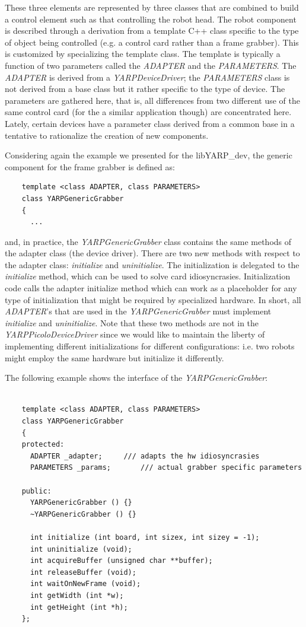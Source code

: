 These three elements are represented by three classes that are combined to build a control element such as that controlling the robot head. The robot component is described through a derivation from a template C++ class specific to the type of object being controlled (e.g. a control card rather than a frame grabber). This is customized by specializing the template class. The template is typically a function of two parameters called the {\em ADAPTER} and the {\em PARAMETERS}. The {\em ADAPTER} is derived from a {\em YARPDeviceDriver}; the {\em PARAMETERS} class is not derived from a base class but it rather specific to the type of device. The parameters are gathered here, that is, all differences from two different use of the same control card (for the a similar application though) are concentrated here. Lately, certain devices have a parameter class derived from a common base in a tentative to rationalize the creation of new components. 

Considering again the example we presented for the libYARP\_dev, the generic component for the frame grabber is defined as:

\begin{verbatim}
    template <class ADAPTER, class PARAMETERS>
    class YARPGenericGrabber
    {
      ...
\end{verbatim}

\noindent and, in practice, the {\em YARPGenericGrabber} class contains the same methods of the adapter class (the device driver). There are two new methods with respect to the adapter class: {\em initialize} and {\em uninitialize}. The initialization is delegated to the {\em initialize} method, which can be used to solve card idiosyncrasies. Initialization code calls the adapter initialize method which can work as a placeholder for any type of initialization that might be required by specialized hardware. In short, all {\em ADAPTER}'s that are used in the {\em YARPGenericGrabber} must implement {\em initialize} and {\em uninitialize}. Note that these two methods are not in the {\em YARPPicoloDeviceDriver} since we would like to maintain the liberty of implementing different initializations for different configurations: i.e. two robots might employ the same hardware but initialize it differently.

The following example shows the interface of the {\em YARPGenericGrabber}:

\begin{verbatim}

    template <class ADAPTER, class PARAMETERS>
    class YARPGenericGrabber
    {
    protected:
      ADAPTER _adapter;		/// adapts the hw idiosyncrasies
      PARAMETERS _params;		/// actual grabber specific parameters

    public:
      YARPGenericGrabber () {}
      ~YARPGenericGrabber () {}

      int initialize (int board, int sizex, int sizey = -1);
      int uninitialize (void);
      int acquireBuffer (unsigned char **buffer);
      int releaseBuffer (void);
      int waitOnNewFrame (void);
      int getWidth (int *w);
      int getHeight (int *h);
    };
		
\end{verbatim}

